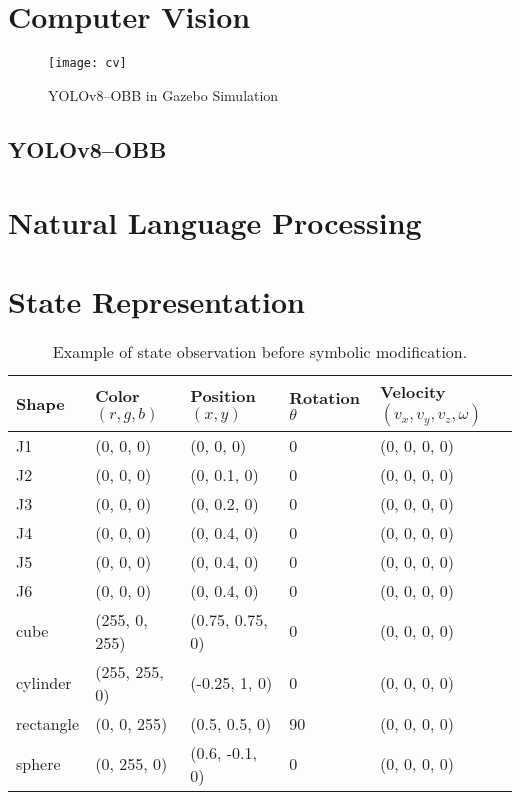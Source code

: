 \section{Computer Vision}
\begin{figure}[htb]
  \centering
  \texttt{[image: cv]}
  \caption{YOLOv8--OBB in Gazebo Simulation}
  \label{fig:cv}
\end{figure}

\subsection{YOLOv8--OBB}
\section{Natural Language Processing}
\section{State Representation}

\begin{table}
	\begin{tiny}
		\begin{center}
			\begin{tabular}{ | m{2cm} | m{2cm}| m{2cm} | m{2cm} | m{3.25cm} |  }
				\hline
				\textbf{Shape} & \textbf{Color $(r, g, b)$} & \textbf{Position $(x,y)$} & \textbf{Rotation $\theta$} & \textbf{Velocity $(v_x, v_y, v_z, \omega)$} \\
				\hline
				J1 & (0, 0, 0) & (0, 0, 0) & 0\textdegree & (0, 0, 0, 0) \\ 
				\hline
				J2 & (0, 0, 0) & (0, 0.1, 0) & 0\textdegree & (0, 0, 0, 0) \\ 
				\hline
				J3 & (0, 0, 0) & (0, 0.2, 0) & 0\textdegree & (0, 0, 0, 0) \\ 
				\hline
				J4 & (0, 0, 0) & (0, 0.4, 0) & 0\textdegree & (0, 0, 0, 0) \\ 
				\hline
				J5 & (0, 0, 0) & (0, 0.4, 0) & 0\textdegree & (0, 0, 0, 0) \\ 
				\hline
				J6 & (0, 0, 0) & (0, 0.4, 0) & 0\textdegree & (0, 0, 0, 0) \\ 
				\hline
				cube & (255, 0, 255) & (0.75, 0.75, 0) & 0\textdegree & (0, 0, 0, 0) \\ 
				\hline
				cylinder & (255, 255, 0) & (-0.25, 1, 0) & 0\textdegree & (0, 0, 0, 0) \\ 
				\hline
				rectangle & (0, 0, 255) & (0.5, 0.5, 0) & 90\textdegree & (0, 0, 0, 0) \\ 
				\hline
				sphere & (0, 255, 0) & (0.6, -0.1, 0) & 0\textdegree & (0, 0, 0, 0) \\ 
				\hline
			\end{tabular}
		\end{center}
	\end{tiny}
	\caption{Example of state observation before symbolic modification.}
	\label{tab:default_state}
\end{table}



